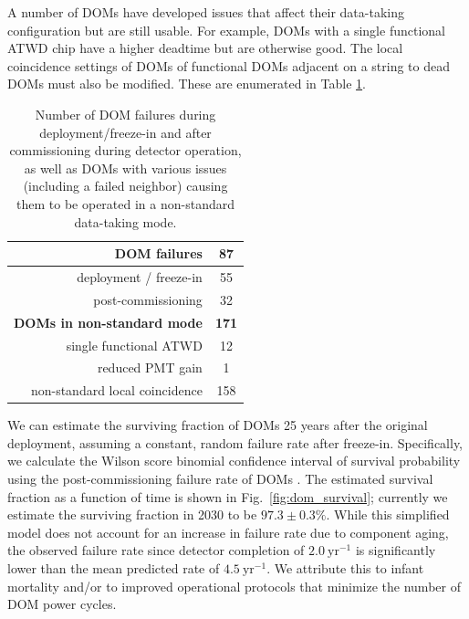 A number of DOMs have developed issues that affect their data-taking
configuration but are still usable.  For example, DOMs with a single functional
ATWD chip have a higher deadtime but are otherwise good.  The local
coincidence settings of DOMs of functional DOMs adjacent on a string to
dead DOMs must also be modified. These are enumerated in Table \ref{tab:dom_failures}.  

\begin{table}[h]
  \centering
  \caption{Number of DOM failures during deployment/freeze-in and after
    commissioning during detector operation, as well as DOMs with various
    issues (including a failed neighbor) causing them to be operated in a
    non-standard data-taking mode.} 
  \label{tab:dom_failures}
  \begin{tabular}{| r | c |}
    \hline
    \bf{DOM failures} & \bf{87} \\
    \hline    
    deployment / freeze-in & 55 \\
    post-commissioning & 32 \\
    \hline
    \hline
    \bf{DOMs in non-standard mode} & \bf{171} \\
    \hline
    single functional ATWD & 12 \\
    reduced PMT gain & 1 \\
    non-standard local coincidence & 158 \\
    \hline    
  \end{tabular}
\end{table}

We can estimate the surviving fraction of DOMs 25 years after the original
deployment, assuming a constant, random failure rate after freeze-in.
Specifically, we calculate the Wilson score binomial confidence interval of
survival probability using the post-commissioning failure rate of DOMs
\cite{Wilson_Score}.  The estimated survival fraction as a function of
time is shown in Fig.~\ref{fig:dom_survival}; currently we estimate the
surviving fraction in 2030 to be $97.3\pm0.3\%$.  While this simplified
model does not account for an increase in failure rate due to component aging, the
observed failure rate since detector completion of $2.0~\mathrm{yr}^{-1}$ is
significantly lower than the mean predicted rate of $4.5~\mathrm{yr}^{-1}$.  We attribute
this to infant mortality and/or to improved operational protocols that
minimize the number of DOM power cycles.

